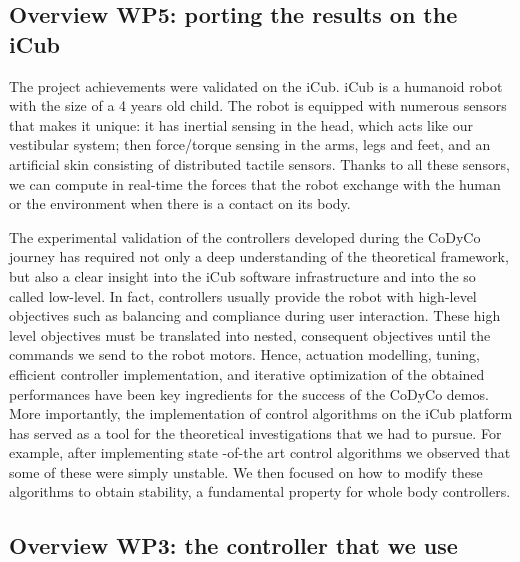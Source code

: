\documentclass[12pt,a4paper,twoside]{article}
\begin{document}
\subsection{Overview WP5: porting the results on the iCub}

The project achievements were validated on the iCub. iCub is a humanoid robot with the size of a 4 years old child. The robot is equipped with numerous sensors that makes it unique: it has inertial sensing in the head, which acts like our vestibular system; then force/torque sensing in the arms, legs and feet, and an artificial skin consisting of distributed tactile sensors. Thanks to all these sensors, we can compute in real-time the forces that the robot exchange with the human or the environment when there is a contact on its body.

The experimental validation of the controllers developed during the CoDyCo journey has required not only a deep understanding of the theoretical framework, but also a clear insight into the iCub software infrastructure and into the so called low-level. In fact, controllers usually provide the robot with high-level objectives such as balancing and compliance during user interaction. These high level objectives must be translated into nested, consequent objectives until the commands we send to the robot motors. Hence, actuation modelling, tuning, efficient controller implementation, and iterative optimization of the obtained performances have been key ingredients for the success of the CoDyCo demos. More importantly, the implementation of control algorithms on the iCub platform has served as a tool for the theoretical investigations that we had to pursue. For example, after implementing state -of-the art control algorithms we observed that some of these were simply unstable. We then focused on how to modify these algorithms to obtain stability, a fundamental property for whole body controllers.

\subsection{Overview WP3: the controller that we use}
\end{document}
